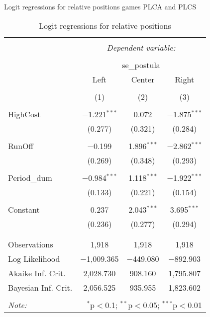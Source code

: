 \begin{table}[!htbp] \centering 
  \caption{Logit regressions for relative positions games PLCA and PLCS} 
  \label{} 
  \caption{Logit regressions for relative positions} 
  \label{} 
\begin{tabular}{@{\extracolsep{5pt}}lccc} 
\\[-1.8ex]\hline 
\hline \\[-1.8ex] 
 & \multicolumn{3}{c}{\textit{Dependent variable:}} \\ 
\cline{2-4} 
\\[-1.8ex] & \multicolumn{3}{c}{se\_postula} \\ 
 & Left & Center & Right \\ 
\\[-1.8ex] & (1) & (2) & (3)\\ 
\hline \\[-1.8ex] 
 HighCost & $-$1.221$^{***}$ & 0.072 & $-$1.875$^{***}$ \\ 
  & (0.277) & (0.321) & (0.284) \\ 
  & & & \\ 
 RunOff & $-$0.199 & 1.896$^{***}$ & $-$2.862$^{***}$ \\ 
  & (0.269) & (0.348) & (0.293) \\ 
  & & & \\ 
 Period\_dum & $-$0.984$^{***}$ & 1.118$^{***}$ & $-$1.922$^{***}$ \\ 
  & (0.133) & (0.221) & (0.154) \\ 
  & & & \\ 
 Constant & 0.237 & 2.043$^{***}$ & 3.695$^{***}$ \\ 
  & (0.236) & (0.277) & (0.294) \\ 
  & & & \\ 
\hline \\[-1.8ex] 
Observations & 1,918 & 1,918 & 1,918 \\ 
Log Likelihood & $-$1,009.365 & $-$449.080 & $-$892.903 \\ 
Akaike Inf. Crit. & 2,028.730 & 908.160 & 1,795.807 \\ 
Bayesian Inf. Crit. & 2,056.525 & 935.955 & 1,823.602 \\ 
\hline 
\hline \\[-1.8ex] 
\textit{Note:}  & \multicolumn{3}{r}{$^{*}$p$<$0.1; $^{**}$p$<$0.05; $^{***}$p$<$0.01} \\ 
\end{tabular} 
\end{table} 